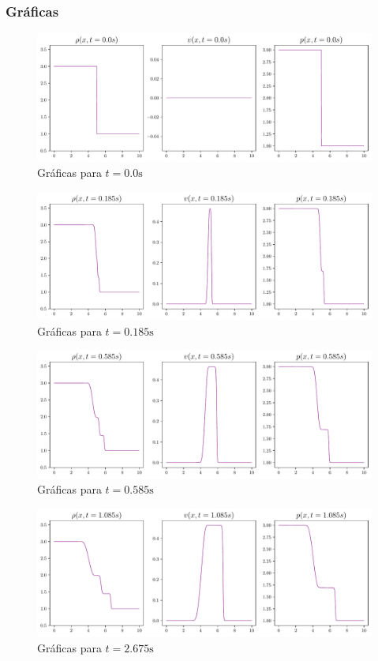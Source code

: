 \subsubsection{Gráficas}
\begin{figure}[ht]
	\centering
	\includegraphics[width=1\linewidth]{../euler1D/plots_en_TDG/set2/1.pdf}
	\caption{Gráficas para $t=0.0\unit{\s}$}
\end{figure}
\begin{figure}[ht]
	\includegraphics[width=1.1\linewidth]{../euler1D/plots_en_TDG/set2/20.pdf}
	\caption{Gráficas para $t=0.185\unit{\s}$}
\end{figure}
\begin{figure}[ht]
	\includegraphics[width=1.1\linewidth]{../euler1D/plots_en_TDG/set2/60.pdf}
	\caption{Gráficas para $t=0.585\unit{\s}$}
\end{figure}
\begin{figure}[ht]
	\includegraphics[width=1.1\linewidth]{../euler1D/plots_en_TDG/set2/110.pdf}
	\caption{Gráficas para $t=2.675\unit{\s}$}
\end{figure}
\clearpage
